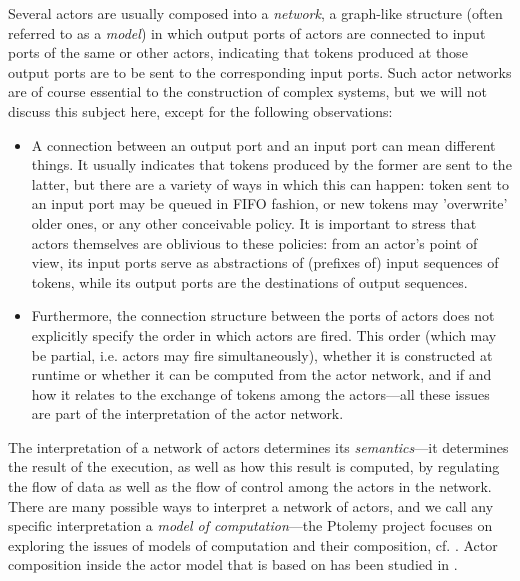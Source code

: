 Several actors are usually composed into a {\em
  network}, a graph-like structure (often referred to as a {\em
  model}) in which output ports of actors are connected
to input ports of the same or other actors, indicating that tokens
produced at those output ports are to be sent to the corresponding
input ports. Such actor networks are of course essential to the construction
of complex systems, but we will not discuss this subject here, except
for the following observations:

\begin{itemize}
\item {}
   A connection between an output port and
  an input port can mean different things. It usually indicates that
  tokens produced by the former are sent to the latter, but there are
  a variety of ways in which this can happen: token sent to an input
  port may be queued in FIFO fashion, or new tokens may 'overwrite'
  older ones, or any other conceivable policy.  It is important to
  stress that actors themselves are oblivious to these policies: from
  an actor's point of view, its input ports serve as abstractions of
  (prefixes of) input sequences of tokens, while its output ports are
  the destinations of output sequences.
\item {}
Furthermore, the connection structure between the ports of
  actors does not explicitly specify the order in which actors are
  fired. This order (which may be partial, i.e. actors may fire
  simultaneously), whether it is constructed at runtime or whether it
  can be computed from the actor network, and if and how it relates to
  the exchange of tokens among the actors---all these issues are part
  of the interpretation of the actor network.
\end{itemize}

  The interpretation of a
network of actors determines its  {\em semantics}---it determines the result
of the execution, as well as how this result is computed, by
regulating the flow of data as well as the flow of control among the
actors in the network. There are many possible ways to interpret a
network of actors, and we call any specific interpretation a {\em
  model of computation}---the Ptolemy project focuses on exploring the
issues of models of computation and their composition, cf.
\cite{LeeEA+98}. Actor composition inside the
actor model that \Cal is based on has been studied in
\cite{JanneckJW03}.

